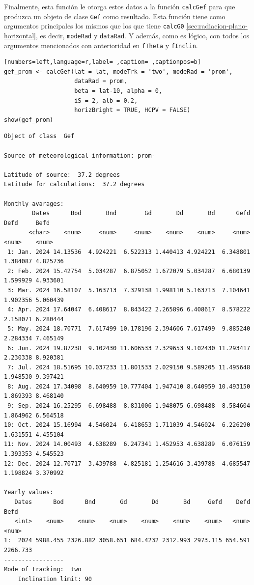 Finalmente, esta función le otorga estos datos a la función \texttt{calcGef} para que produzca un objeto de clase \texttt{Gef} como resultado. Esta función tiene como argumentos principales los mismos que los que tiene \texttt{calcG0} \ref{sec:radiacion-plano-horizontal}, es decir, \texttt{modeRad} y \texttt{dataRad}. Y además, como es lógico, con todos los argumentos mencionados con anterioridad en \texttt{fTheta} y \texttt{fInclin}.
\begin{lstlisting}[numbers=left,language=r,label= ,caption= ,captionpos=b]
gef_prom <- calcGef(lat = lat, modeTrk = 'two', modeRad = 'prom',
                    dataRad = prom,
                    beta = lat-10, alpha = 0,
                    iS = 2, alb = 0.2,
                    horizBright = TRUE, HCPV = FALSE)
show(gef_prom)
\end{lstlisting}

\begin{verbatim}
Object of class  Gef 

Source of meteorological information: prom- 

Latitude of source:  37.2 degrees
Latitude for calculations:  37.2 degrees

Monthly avarages:
        Dates      Bod       Bnd        Gd       Dd       Bd      Gefd     Defd     Befd
       <char>    <num>     <num>     <num>    <num>    <num>     <num>    <num>    <num>
 1: Jan. 2024 14.13536  4.924221  6.522313 1.440413 4.924221  6.348801 1.384087 4.825736
 2: Feb. 2024 15.42754  5.034287  6.875052 1.672079 5.034287  6.680139 1.599929 4.933601
 3: Mar. 2024 16.58107  5.163713  7.329138 1.998110 5.163713  7.104641 1.902356 5.060439
 4: Apr. 2024 17.64047  6.408617  8.843422 2.265896 6.408617  8.578222 2.158071 6.280444
 5: May. 2024 18.70771  7.617499 10.178196 2.394606 7.617499  9.885240 2.284334 7.465149
 6: Jun. 2024 19.87238  9.102430 11.606533 2.329653 9.102430 11.293417 2.230338 8.920381
 7: Jul. 2024 18.51695 10.037233 11.801533 2.029150 9.589205 11.495648 1.948530 9.397421
 8: Aug. 2024 17.34098  8.640959 10.777404 1.947410 8.640959 10.493150 1.869393 8.468140
 9: Sep. 2024 16.25295  6.698488  8.831006 1.948075 6.698488  8.584604 1.864962 6.564518
10: Oct. 2024 15.16994  4.546024  6.418653 1.711039 4.546024  6.226290 1.631551 4.455104
11: Nov. 2024 14.00493  4.638289  6.247341 1.452953 4.638289  6.076159 1.393353 4.545523
12: Dec. 2024 12.70717  3.439788  4.825181 1.254616 3.439788  4.685547 1.198824 3.370992

Yearly values:
   Dates      Bod      Bnd       Gd       Dd       Bd     Gefd    Defd     Befd
   <int>    <num>    <num>    <num>    <num>    <num>    <num>   <num>    <num>
1:  2024 5988.455 2326.882 3058.651 684.4232 2312.993 2973.115 654.591 2266.733
-----------------
Mode of tracking:  two 
    Inclination limit: 90
\end{verbatim}

